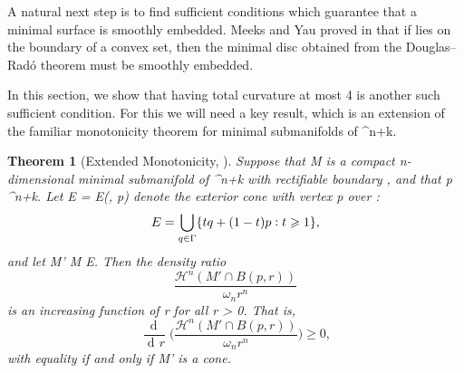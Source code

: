 \documentclass[a4paper, 11pt]{article}
\theoremstyle{plain}
\newtheorem{theorem}{Theorem}[section]
\theoremstyle{definition}
\theoremstyle{remark}
\DeclareMathOperator{\diff}{d \!}
\numberwithin{equation}{subsection}
\def\({}
\def\){}
\def\pi{}
\begin{document}
A natural next step is to find sufficient conditions which guarantee that a minimal surface is smoothly embedded. Meeks and Yau proved in \cite{MY82} that if \(\Gamma\) lies on the boundary of a convex set, then the minimal disc obtained from the Douglas--Rad{\'o} theorem must be smoothly embedded. 

In this section, we show that \(\Gamma\) having total curvature at most \(4\pi\) is another such sufficient condition. For this we will need a key result, which is an extension of the familiar monotonicity theorem for minimal submanifolds of \(^{n+k}\).

\begin{theorem}[{Extended Monotonicity, \cite[Theorem 5]{Whi16}}]
\label{Extended Monotonicity}
Suppose that \(M\) is a compact \(n\)-dimensional minimal submanifold of \(^{n+k}\) with rectifiable boundary \(\Gamma\), and that \(p \in {}^{n+k}\). Let \(E = E(\Gamma, p)\) denote the \emph{exterior cone} with vertex \(p\) over \(\Gamma\):
\begin{equation}
E = \bigcup_{q \in \Gamma}\{tq + (1-t)p \vcentcolon t \geqslant 1\},
\end{equation}
and let \(M' \coloneq M \cup E\). Then the density ratio
\begin{equation}
\frac{\mathcal{H}^{n}(M' \cap B(p,r))}{\omega_{n}r^{n}}
\end{equation}
is an increasing function of \(r\) for all \(r > 0\). That is,
\begin{equation}
\frac{\!\diff}{\diff r}\biggl(\frac{\mathcal{H}^{n}(M' \cap B(p,r))}{\omega_{n}r^{n}}\biggr) \geqslant 0,
\end{equation}
with equality if and only if \(M'\) is a cone.
\end{theorem}
\end{document}
